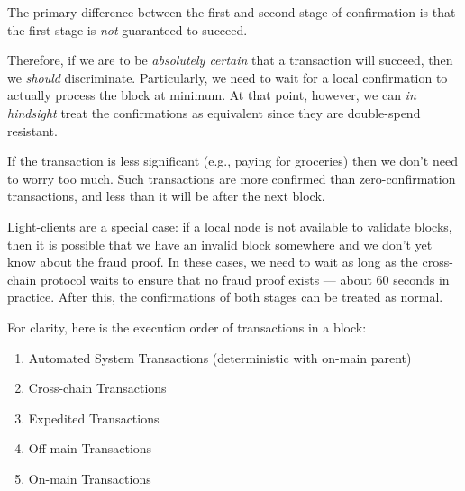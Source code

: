

The primary difference between the first and second stage of confirmation is that the first stage is \emph{not} guaranteed to succeed.

Therefore, if we are to be \emph{absolutely certain} that a transaction will succeed, then we \emph{should} discriminate.
Particularly, we need to wait for a local confirmation to actually process the block at minimum.
At that point, however, we can \emph{in hindsight} treat the confirmations as equivalent since they are double-spend resistant.

If the transaction is less significant (e.g., paying for groceries) then we don't need to worry too much.
Such transactions are more confirmed than zero-confirmation transactions, and less than it will be after the next block.

Light-clients are a special case: if a local node is not available to validate blocks, then it is possible that we have an invalid block somewhere and we don't yet know about the fraud proof.
In these cases, we need to wait as long as the cross-chain protocol waits to ensure that no fraud proof exists --- about 60 seconds in practice.
After this, the confirmations of both stages can be treated as normal.


For clarity, here is the execution order of transactions in a block:
\begin{enumerate}
    \item Automated System Transactions (deterministic with on-main parent)
    \item Cross-chain Transactions
    \item Expedited Transactions
    \item Off-main Transactions
    \item On-main Transactions
\end{enumerate}

